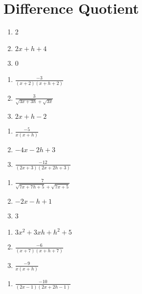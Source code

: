 \section*{Difference Quotient}
\begin{multicols}{3}
\begin{enumerate}
	\item 2
	\item $2x + h + 4$
	\item 0
\end{enumerate}	\setcounter{Review}{\value{enumi}}
\end{multicols}
\begin{multicols}{3}
\begin{enumerate}	\setcounter{enumi}{\value{Review}} 
    \item $\frac{-3}{(x+2)(x+h+2)}$
    \item $\frac{3}{\sqrt{3x+3h}+\sqrt{3x}}$
    \item $2x+h-2$
\end{enumerate}	\setcounter{Review}{\value{enumi}}
\end{multicols}
\begin{multicols}{3}
\begin{enumerate}	\setcounter{enumi}{\value{Review}} 
    \item $\frac{-5}{x(x+h)}$
    \item $-4x-2h+3$
    \item $\frac{-12}{(2x+3)(2x+2h+3)}$
\end{enumerate}	\setcounter{Review}{\value{enumi}}
\end{multicols}
\begin{multicols}{3}
\begin{enumerate}	\setcounter{enumi}{\value{Review}} 
    \item $\frac{7}{\sqrt{7x+7h+5}+\sqrt{7x+5}}$
    \item $-2x - h + 1$
    \item 3
\end{enumerate}	\setcounter{Review}{\value{enumi}}
\end{multicols}
\begin{multicols}{3}
\begin{enumerate}	\setcounter{enumi}{\value{Review}} 
    \item $3x^2 + 3xh + h^2 + 5$
    \item $\frac{-6}{(x+7)(x+h+7)}$
    \item $\frac{-9}{x(x+h)}$
\end{enumerate}	\setcounter{Review}{\value{enumi}}
\end{multicols}
\begin{multicols}{3}
\begin{enumerate}	\setcounter{enumi}{\value{Review}} 
    \item $\frac{-10}{(2x-1)(2x+2h-1)}$
\end{enumerate}
\end{multicols}
